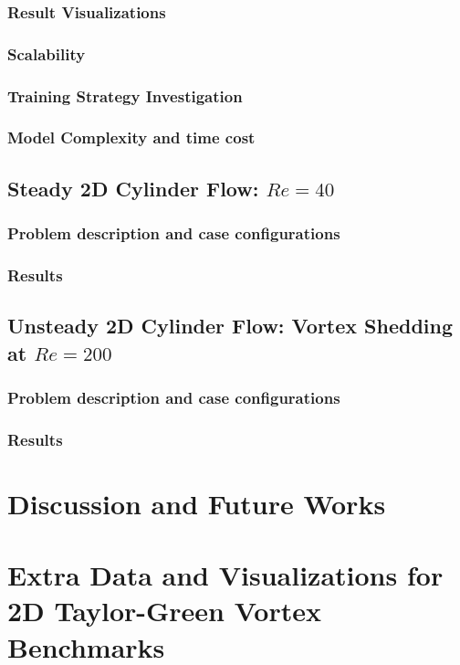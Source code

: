 \documentclass[font=STIX2]{gw-dissertation}[2021/11/19]
\begin{document}
        \subsection{Result Visualizations}
        

        \subsection{Scalability}
        

        \subsection{Training Strategy Investigation}
        

        \subsection{Model Complexity and time cost}
        

    \section{Steady 2D Cylinder Flow: $Re=40$}
        \subsection{Problem description and case configurations}
        \subsection{Results}
        
    \section{Unsteady 2D Cylinder Flow: Vortex Shedding at $Re=200$}
        \subsection{Problem description and case configurations}
        \subsection{Results}

\chapter{Discussion and Future Works}\label{chap:discussion}


\sloppy
\printbibliography[heading=bibintoc, title=References]
\fussy

\appendix
\chapter{Extra Data and Visualizations for 2D Taylor-Green Vortex Benchmarks}\label{sec:extra-data}
% 
\end{document}
